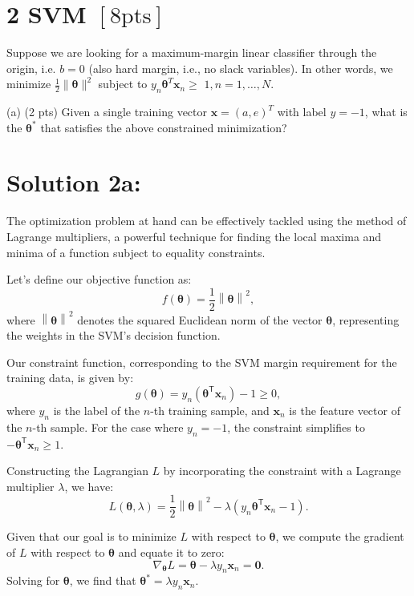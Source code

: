 \documentclass[10pt]{article}
\newcommand{\norm}[1]{\left\lVert #1 \right\rVert}
\begin{document}
\section*{2 SVM $[8 \mathrm{pts}]$}
Suppose we are looking for a maximum-margin linear classifier through the origin, i.e. $b=0$ (also hard margin, i.e., no slack variables). In other words, we minimize $\frac{1}{2}\|\boldsymbol{\theta}\|^{2}$ subject to $y_{n} \boldsymbol{\theta}^{T} \boldsymbol{x}_{n} \geq$ $1, n=1, \ldots, N$.

(a) (2 pts) Given a single training vector $\boldsymbol{x}=(a, e)^{T}$ with label $y=-1$, what is the $\boldsymbol{\theta}^{*}$ that satisfies the above constrained minimization?

\section*{Solution 2a:}

The optimization problem at hand can be effectively tackled using the method of Lagrange multipliers, a powerful technique for finding the local maxima and minima of a function subject to equality constraints.

Let's define our objective function as:
\[
f(\boldsymbol{\theta}) = \frac{1}{2} \norm{\boldsymbol{\theta}}^2,
\]
where $\norm{\boldsymbol{\theta}}^2$ denotes the squared Euclidean norm of the vector $\boldsymbol{\theta}$, representing the weights in the SVM's decision function.

Our constraint function, corresponding to the SVM margin requirement for the training data, is given by:
\[
g(\boldsymbol{\theta}) = y_n(\boldsymbol{\theta}^\mathsf{T}\mathbf{x}_n) - 1 \geq 0,
\]
where $y_n$ is the label of the $n$-th training sample, and $\mathbf{x}_n$ is the feature vector of the $n$-th sample. For the case where $y_n = -1$, the constraint simplifies to $-\boldsymbol{\theta}^\mathsf{T}\mathbf{x}_n \geq 1$.

Constructing the Lagrangian $L$ by incorporating the constraint with a Lagrange multiplier $\lambda$, we have:
\[
L(\boldsymbol{\theta}, \lambda) = \frac{1}{2} \norm{\boldsymbol{\theta}}^2 - \lambda (y_n\boldsymbol{\theta}^\mathsf{T}\mathbf{x}_n - 1).
\]

Given that our goal is to minimize $L$ with respect to $\boldsymbol{\theta}$, we compute the gradient of $L$ with respect to $\boldsymbol{\theta}$ and equate it to zero:
\[
\nabla_{\boldsymbol{\theta}} L = \boldsymbol{\theta} - \lambda y_n \mathbf{x}_n = \mathbf{0}.
\]
Solving for $\boldsymbol{\theta}$, we find that $\boldsymbol{\theta}^* = \lambda y_n \mathbf{x}_n$.
\end{document}
